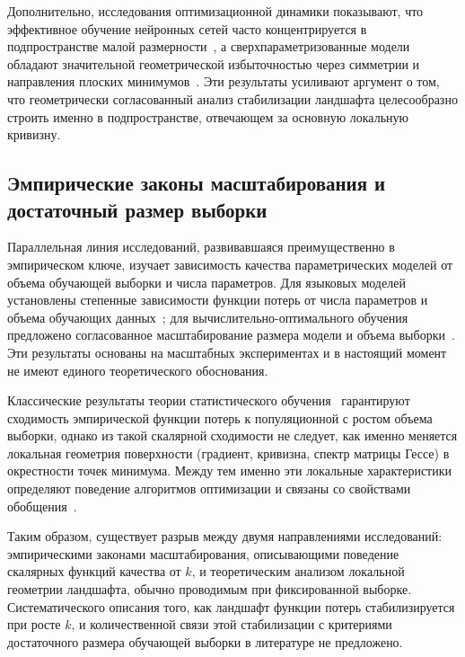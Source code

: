 Дополнительно, исследования оптимизационной динамики показывают, что эффективное обучение нейронных сетей часто концентрируется в подпространстве малой размерности~\cite{gurari2018tiny,li2018intrinsic}, а сверхпараметризованные модели обладают значительной геометрической избыточностью через симметрии и направления плоских минимумов~\cite{simsek2021geometry}. Эти результаты усиливают аргумент о том, что геометрически согласованный анализ стабилизации ландшафта целесообразно строить именно в подпространстве, отвечающем за основную локальную кривизну.

\subsection{Эмпирические законы масштабирования и достаточный размер выборки}\label{subsec:scaling-review}

Параллельная линия исследований, развивавшаяся преимущественно в эмпирическом ключе, изучает зависимость качества параметрических моделей от объема обучающей выборки и числа параметров. Для языковых моделей установлены степенные зависимости функции потерь от числа параметров и объема обучающих данных~\cite{kaplan2020scaling}; для вычислительно-оптимального обучения предложено согласованное масштабирование размера модели и объема выборки~\cite{hoffmann2022chinchila}. Эти результаты основаны на масштабных экспериментах и в настоящий момент не имеют единого теоретического обоснования.

Классические результаты теории статистического обучения~\cite{vapnik1998statistical,shalev2014understanding} гарантируют сходимость эмпирической функции потерь к популяционной с ростом объема выборки, однако из такой скалярной сходимости не следует, как именно меняется локальная геометрия поверхности (градиент, кривизна, спектр матрицы Гессе) в окрестности точек минимума. Между тем именно эти локальные характеристики определяют поведение алгоритмов оптимизации и связаны со свойствами обобщения~\cite{dauphin2014,papyan2019measurements}.

Таким образом, существует разрыв между двумя направлениями исследований: эмпирическими законами масштабирования, описывающими поведение скалярных функций качества от $k$, и теоретическим анализом локальной геометрии ландшафта, обычно проводимым при фиксированной выборке. Систематического описания того, как ландшафт функции потерь стабилизируется при росте $k$, и количественной связи этой стабилизации с критериями достаточного размера обучающей выборки в литературе не предложено.

